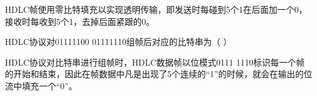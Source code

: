 \begin{solution}HDLC帧使用零比特填充以实现透明传输，即发送时每碰到5个1在后面加一个0，接收时每收到5个1，去掉后面紧跟的0。
\end{solution}
\question HDLC协议对01111100 01111110组帧后对应的比特串为（ ）
\par{}
\begin{solution}HDLC协议对比特串进行组帧时，HDLC数据帧以位模式0111
1110标识每一个帧的开始和结束，因此在帧数据中凡是出现了5个连续的``1''的时候，就会在输出的位流中填充一个``0''。
\end{solution}
